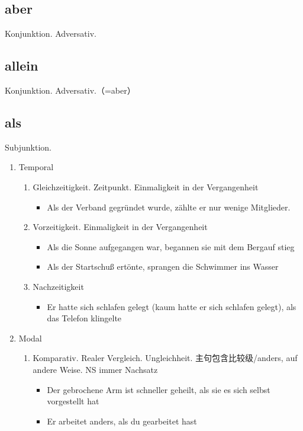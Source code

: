 \documentclass[UTF8]{report}
\begin{document}
\subsection{aber}
Konjunktion. Adversativ.
\subsection{allein}
Konjunktion. Adversativ.（=aber）


\subsection{als}
Subjunktion. 
\begin{enumerate}
    \item Temporal
    \begin{enumerate}
        \item Gleichzeitigkeit. Zeitpunkt. Einmaligkeit in der Vergangenheit
        \begin{itemize}
            \item Als der Verband gegründet wurde, zählte er nur wenige Mitglieder.
        \end{itemize}
        \item Vorzeitigkeit. Einmaligkeit in der Vergangenheit
        \begin{itemize}
            \item Als die Sonne aufgegangen war, begannen sie mit dem Bergauf stieg
            \item Als der Startschuß ertönte, sprangen die Schwimmer ins Wasser
        \end{itemize}
        \item Nachzeitigkeit
        \begin{itemize}
            \item Er hatte sich schlafen gelegt (kaum hatte er sich schlafen gelegt), als das Telefon klingelte
        \end{itemize}
    \end{enumerate}
    \item Modal
    \begin{enumerate}
        \item Komparativ. Realer Vergleich. Ungleichheit. 主句包含比较级/anders, auf andere Weise. NS immer Nachsatz
        \begin{itemize}
            \item Der gebrochene Arm ist schneller geheilt, als sie es sich selbst vorgestellt hat
            \item Er arbeitet anders, als du gearbeitet hast

\end{itemize}
\end{enumerate}
\end{enumerate}
\end{document}
